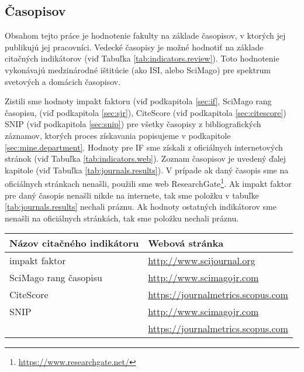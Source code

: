 \subsection{Časopisov}

Obsahom tejto práce je hodnotenie fakulty na základe časopisov, v ktorých jej
publikujú jej pracovníci. Vedecké časopisy je možné hodnotiť na základe
citačných indikátorov (viď Tabuľka \ref{tab:indicators.review}). Toto
hodnotenie vykonávajú medzinárodné ištitúcie (ako ISI, alebo SciMago) pre
spektrum svetových a domácich časopisov. 

Zistili sme hodnoty impakt faktoru (viď podkapitola \ref{sec:if}, SciMago rang
časopisu, (viď podkapitola \ref{sec:sjr}), CiteScore (viď podkapitola
\ref{sec:citescore}) SNIP (viď podkapitola \ref{sec:snip}) pre všetky časopisy
z bibliografických záznamov, ktorých proces získavania popisujeme v podkapitole
\ref{sec:mine.department}.  Hodnoty pre IF sme získali z oficiálnych
internetových stránok (viď Tabuľka \ref{tab:indicators.web}).  Zoznam časopisov
je uvedený ďalej kapitole (viď Tabuľka \ref{tab:journals.results}).  V prípade
ak daný časopis sme na oficiálnych stránkach nenašli, použili sme web
ResearchGate\footnote{\url{https://www.researchgate.net/}}.  Ak impakt faktor
pre daný časopis nenašli nikde na internete, tak sme položku v tabuľke
\ref{tab:journals.results} nechali práznu.  Ak hodnoty ostatných indikátorov
sme nenašli na  oficiálnych stránkách, tak sme položku nechali práznu.

\begin{SCtable}
\centering\small
  \caption[Webové stránky citačných indikátorov na hodnotenie časopisov]
  {Zoznam citačných indikátorov na hodnotenie časopisov, s~odkazmi na oficiálne
  webové stránky}
\label{tab:indicators.web}
\begin{tabular}{ll}
  \toprule\noalign{\vspace{.3ex}}
  Názov citačného indikátoru      & Webová stránka\\[0.3ex]
  \midrule\noalign{\vspace{.5ex}}
  impakt faktor                   & {\footnotesize \url{http://www.scijournal.org}} \\[0.5ex]
  SciMago rang časopisu           & {\footnotesize \url{http://www.scimagojr.com}}\\[0.5ex]
  CiteScore                       & {\footnotesize \url{https://journalmetrics.scopus.com}} \\[0.5ex]
  SNIP                            & {\footnotesize \url{http://www.scimagojr.com}} \\[-0.25ex]
                                  & {\footnotesize \url{https://journalmetrics.scopus.com}} \\[0.5ex]
  \bottomrule
\end{tabular}
\end{SCtable}

